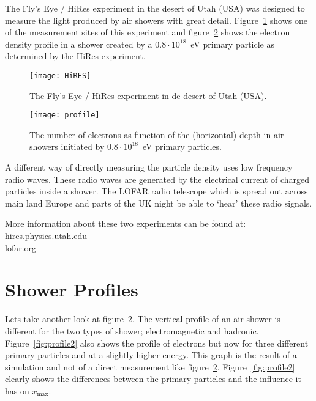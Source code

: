 The Fly's Eye / HiRes experiment in the desert of Utah (USA) was designed to measure the light produced by air showers with great detail. Figure~\ref{fig:HiRES} shows one of the measurement sites of this experiment and figure~\ref{fig:profile} shows the electron density profile in a shower created by a $0.8 \cdot 10^{18}$~eV primary particle as determined by the HiRes experiment.

\begin{figure}\begin{center}
\texttt{[image: HiRES]}%
\caption{The Fly's Eye / HiRes experiment in de desert of Utah (USA).}\label{fig:HiRES}
\end{center}\end{figure}

\begin{figure}\begin{center}
\texttt{[image: profile]}%
\caption{The number of electrons as function of the (horizontal) depth in air showers initiated by $0.8 \cdot 10^{18}$~eV primary particles.}\label{fig:profile}
\end{center}\end{figure}

A different way of directly measuring the particle density uses low frequency radio waves. These radio waves are generated by the electrical current of charged particles inside a shower. The LOFAR radio telescope which is spread out across main land Europe and parts of the UK night be able to `hear' these radio signals.

More information about these two experiments can be found at:\\
\url{hires.physics.utah.edu} \\
\url{lofar.org}

\section{Shower Profiles}
Lets take another look at figure~\ref{fig:profile}. The vertical profile of an air shower is different for the two types of shower; electromagnetic and hadronic. Figure~\ref{fig:profile2} also shows the profile of electrons but now for three different primary particles and at a slightly higher energy. This graph is the result of a simulation and not of a direct measurement like figure~\ref{fig:profile}. Figure~\ref{fig:profile2} clearly shows the differences between the primary particles and the influence it has on $x_{\mbox{max}}$. 

